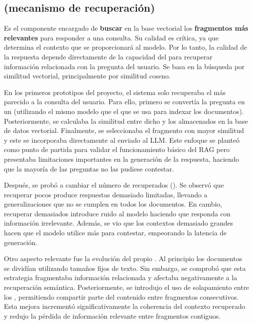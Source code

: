 \subsection{ (mecanismo de recuperación)}

Es el componente encargado de \textbf{buscar} en la base vectorial los \textbf{fragmentos más relevantes} para responder a una consulta. Su calidad es crítica, ya que determina el contexto que se proporcionará al modelo. Por lo tanto, la calidad de la respuesta depende directamente de la capacidad del  para recuperar información relacionada con la pregunta del usuario. Se basa en la búsqueda por similitud vectorial, principalmente por similitud coseno. 

En los primeros prototipos del proyecto, el sistema solo recuperaba el  más parecido a la consulta del usuario. Para ello, primero se convertía la pregunta en un  (utilizando el mismo modelo que el que se usa para indexar los documentos). Posteriormente, se calculaba la similitud entre dicho  y los almacenados en la base de datos vectorial. Finalmente, se seleccionaba el fragmento con mayor similitud y este se incorporaba directamente al  enviado al LLM. Este enfoque se planteó como punto de partida para validar el funcionamiento básico del RAG pero presentaba limitaciones importantes en la generación de la respuesta, haciendo que la mayoría de las preguntas no las pudiese contestar.

Después, se probó a cambiar el número de  recuperados (). Se observó que recuperar pocos  produce respuestas demasiado limitadas, llevando a generalizaciones que no se cumplen en todos los documentos. En cambio, recuperar demasiados introduce ruido al modelo haciendo que responda con información irrelevante. Además, se vio que los contextos demasiado grandes hacen que el modelo utilice más  para contestar, empeorando la latencia de generación.

Otro aspecto relevante fue la evolución del propio . Al principio los documentos se dividían utilizando tamaños fijos de texto. Sin embargo, se comprobó que esta estrategia fragmentaba información relacionada y afectaba negativamente a la recuperación semántica. Posteriormente, se introdujo el uso de solapamiento entre los , permitiendo compartir parte del contenido entre fragmentos consecutivos. Esta mejora incrementó significativamente la coherencia del contexto recuperado y redujo la pérdida de información relevante entre fragmentos contiguos.

